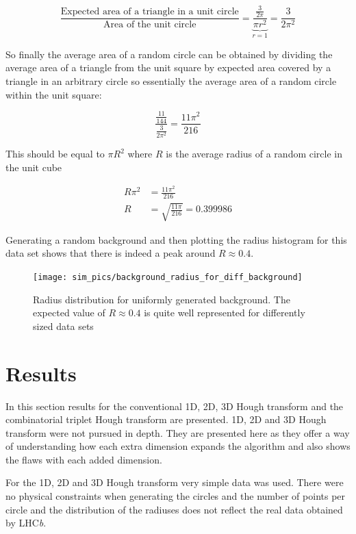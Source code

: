 \documentclass[11pt]{scrreprt}
\begin{document}
\[
\frac{\text{Expected area of a triangle in a unit circle}}{\text{Area of the unit circle}} = \underbrace{\frac{\frac{3}{2\pi}}{\pi r^2}}_{r=1} = \frac{3}{2\pi^2}
\]

So finally the average area of a random circle can be obtained by dividing the average area of a triangle from the unit square by expected
area covered by a triangle in an arbitrary circle so essentially the average area of a random circle within the unit square:

\[
  \frac{\frac{11}{144}}{\frac{3}{2\pi^2}} = \frac{11\pi^2}{216}
\]

This should be equal to $\pi R^2$ where $R$ is the average radius of a random circle in the unit cube

\begin{align}
  R\pi^2 &= \frac{11\pi^2}{216}\nonumber\\
  R &= \sqrt{\frac{11\pi}{216}} = 0.399986\nonumber
\end{align}

Generating a random background and then plotting the radius histogram for this data set shows that there is indeed a peak around
 $R\approx 0.4$.

 \begin{figure}[tb]
   \centering
   \texttt{[image: sim\_pics/background\_radius\_for\_diff\_background]}
   \caption[Radius distribution for background]{Radius distribution for uniformly generated 
    background. The expected value of $R\approx 0.4$
   is quite well represented for differently sized data sets}
   \label{fig:rad_dist}
 \end{figure}

\chapter{Results}
\label{cha:results}
In this section results for the conventional 1D, 2D, 3D Hough transform and 
the combinatorial triplet Hough transform are presented. 1D, 2D and 3D Hough transform
were not pursued in depth. They are presented here as they offer a 
way of understanding how each extra dimension expands the algorithm and also
shows the flaws with each added dimension.

For the 1D, 2D and 3D Hough transform very simple data was used. There were 
no physical constraints when generating the circles and the number of points
per circle and the distribution of the radiuses does not reflect the real data obtained
by LHC\textit{b}.
\end{document}
